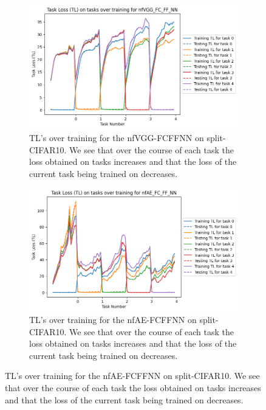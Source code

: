 \begin{appendices}
\begin{figure}[ht]
    \begin{subfigure}[t]{0.4\textwidth}
      \includegraphics[width=\linewidth]{images/CIFAR10_CL/nfVGG_FC_FF_NN_TL_task.png}
      \caption{TL's over training for the nfVGG-FCFFNN on split-CIFAR10. We see that over the course of each task the loss obtained on tasks increases and that the loss of the current task being trained on decreases.}
   \end{subfigure}
   \quad %
   \begin{subfigure}[t]{0.4\textwidth}
      \includegraphics[width=\linewidth]{images/CIFAR10_CL/nfAE_FC_FF_NN_TL_task.png}
      \caption{TL's over training for the nfAE-FCFFNN on split-CIFAR10. We see that over the course of each task the loss obtained on tasks increases and that the loss of the current task being trained on decreases.}
   \end{subfigure}

    \medskip %


\end{figure}
\end{appendices}
